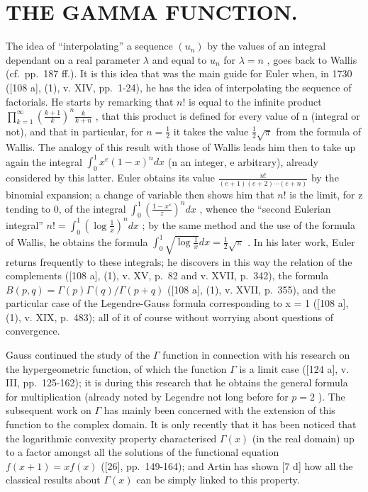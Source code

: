 \chapter{THE GAMMA FUNCTION.}

The idea of ``interpolating'' a sequence \((u_{n})\) by the values of an integral dependant on a real parameter \(\lambda\) and equal to \(u_{n}\) for \(\lambda = n\) , goes back to Wallis (cf.~pp.~187 ff.). It is this idea that was the main guide for Euler when, in 1730 ({[}108 a{]}, (1), v. XIV, pp.~1-24), he has the idea of interpolating the sequence of factorials. He starts by remarking that \(n!\) is equal to the infinite product \(\prod_{k=1}^{\infty}\left(\frac{k+1}{k}\right)^{n}\frac{k}{k+n}\) , that this product is defined for every value of n (integral or not), and that in particular, for \(n = \frac{1}{2}\) it takes the value \(\frac{1}{2}\sqrt{\pi}\) from the formula of Wallis. The analogy of this result with those of Wallis leads him then to take up again the integral \(\int_{0}^{1} x^{e}(1-x)^{n} dx\) (n an integer, e arbitrary), already considered by this latter. Euler obtains its value \(\frac{n!}{(e+1)(e+2)\cdots(e+n)}\) by the binomial expansion; a change of variable then shows him that \(n!\) is the limit, for z tending to 0, of the integral \(\int_{0}^{1}\left(\frac{1-x^{s}}{z}\right)^{n} dx\) , whence the ``second Eulerian integral'' \(n! = \int_{0}^{1}\left(\log\frac{1}{x}\right)^{n} dx\) ; by the same method and the use of the formula of Wallis, he obtains the formula \(\int_{0}^{1}\sqrt{\log\frac{1}{x}} dx = \frac{1}{2}\sqrt{\pi}\) . In his later work, Euler returns frequently to these integrals; he discovers in this way the relation of the complements ({[}108 a{]}, (1), v. XV, p.~82 and v. XVII, p.~342), the formula \(B(p,q) = \Gamma(p)\Gamma(q)/\Gamma(p+q)\) ({[}108 a{]}, (1), v. XVII, p.~355), and the particular case of the Legendre-Gauss formula corresponding to x = 1 ({[}108 a{]}, (1), v. XIX, p.~483); all of it of course without worrying about questions of convergence.

Gauss continued the study of the \(\Gamma\) function in connection with his research on the hypergeometric function, of which the function \(\Gamma\) is a limit case ({[}124 a{]}, v. III, pp.~125-162); it is during this research that he obtains the general formula for multiplication (already noted by Legendre not long before for \(p = 2\) ). The subsequent work on \(\Gamma\) has mainly been concerned with the extension of this function to the complex domain. It is only recently that it has been noticed that the logarithmic convexity property characterised \(\Gamma(x)\) (in the real domain) up to a factor amongst all the solutions of the functional equation \(f(x + 1) = xf(x)\) ({[}26{]}, pp.~149-164); and Artin has shown {[}7 d{]} how all the classical results about \(\Gamma(x)\) can be simply linked to this property.

